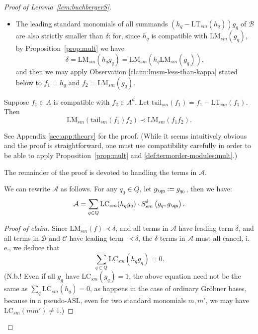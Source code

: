 \documentclass[11pt,reqno]{amsart}
\newcommand{\lmsm}{\text{LM}_{sm}}
\newcommand{\tail}{\text{tail}_{sm}}
\newcommand{\lcsm}{\text{LC}_{sm}}
\newcommand{\ltsm}{\text{LT}_{sm}}
\newcommand{\Ssm}{S_{sm}}
\theoremstyle{definition}
\numberwithin{equation}{section}
\begin{document}
\begin{proof}[Proof of Lemma~\ref{lem:buchbergerS}]
\begin{itemize}
\item The leading standard monomials of all summands $(h_q - \ltsm(h_q))g_q$ of $\mathcal{B}$ are also strictly smaller than $\delta$: for, since $h_q$ is compatible with $\lmsm(g_q)$, by Proposition~\ref{prop:mult} we have 
\[
\delta = \lmsm(h_q g_q) = \lmsm(h_q \lmsm(g_q)),
\]
 and then we may apply Observation \ref{claim:lmsm-less-than-kappa} stated below to $f_1=h_q$ and $f_2 = \lmsm(g_q)$.
\end{itemize}

\begin{observation}[store=claimlmsmlessthankappa]
\label{claim:lmsm-less-than-kappa}
Suppose $f_1 \in A$ is compatible with $f_2 \in A^d$. Let $\tail(f_1) = f_1 - \ltsm(f_1)$. Then 
\[
\lmsm\left(\tail(f_1) f_2\right) \prec \lmsm(f_1 f_2).
\]
\end{observation}
See Appendix \ref{sec:app:theory} for the proof. (While it seems intuitively obvious and the proof is straightforward, one must use compatibility carefully in order to be able to apply Proposition~\ref{prop:mult} and \ref{def:termorder-modules:mult}.)

The remainder of the proof is devoted to handling the terms in $\mathcal{A}$. 

\begin{claim}[store=claimrewriteAintermsofS]
\label{claim:rewrite-A-in-terms-of-S}
We can rewrite $\mathcal{A}$ as follows.
For any $q_0 \in Q$, let $g_{\qn} := g_{q_0}$, then we have:
\begin{equation}
\mathcal{A} = \sum_{q \in Q} \lcsm(h_qg_q) \cdot \Ssm^\delta \left(g_{q}, g_{\qn}\right). \label{eqn:A-as-selem-sum} 
\end{equation}
\end{claim}

\begin{proof}[Proof of claim]
Since $\lmsm(f) \prec \delta$, and all terms in $\mathcal{A}$ have leading term $\delta$, and all terms in $\mathcal{B}$ and $\mathcal{C}$ have leading term $\prec \delta$, the $\delta$ terms in $\mathcal{A}$ must all cancel, i.\,e., we deduce that 
\begin{equation} \label{eqn:coeff-sum-zero} \sum_{q \in Q} \lcsm(h_qg_q) = 0.\end{equation} 
(N.b.! Even if all $g_q$ have $\lcsm(g_q)=1$, the above equation need not be the same as $\sum_q \lcsm(h_q) = 0$, as happens in the case of ordinary Gröbner bases, because in a pseudo-ASL, even for two standard monomials $m,m'$, we may have $\lcsm(mm') \neq 1$.)


\end{proof}
\end{proof}
\end{document}
